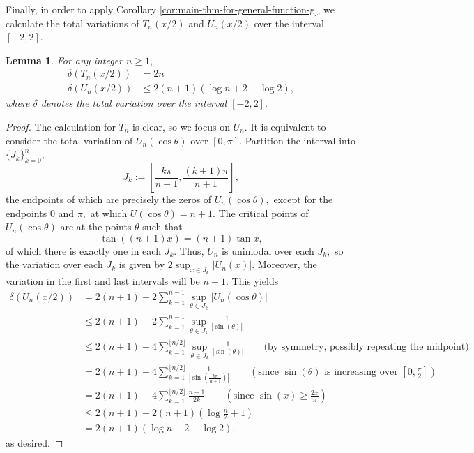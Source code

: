 \documentclass[11pt,letterpaper,reqno]{amsart}
\newtheorem{lemma}[theorem]{Lemma}
\theoremstyle{definition}
\numberwithin{equation}{section}
\numberwithin{figure}{section}
\numberwithin{table}{section}
\newcommand{\lrp}[1]{\left(#1\right)}
\begin{document}
Finally, in order to apply Corollary \ref{cor:main-thm-for-general-function-g}, we calculate the total variations of $T_n(x/2)$ and $U_n(x/2)$ over the interval $[-2, 2].$

\begin{lemma}\label{lem:variation-of-U}
    For any integer $n \geq 1,$
    \begin{align}
        \delta(T_n(x/2)) &= 2n
        \\
        \delta(U_n(x/2)) &\leq 2(n + 1) \left( \log n + 2 - \log 2 \right),
    \end{align}
    where $\delta$ denotes the total variation over the interval $[-2, 2].$
\end{lemma}
\begin{proof}
    The calculation for $T_n$ is clear, so we focus on $U_n.$ It is equivalent to consider the total variation of $U_n(\cos \theta)$ over $[0, \pi].$ Partition the interval into $\{J_k\}_{k = 0}^n,$
    $$J_k := \left[ \frac{k \pi}{n + 1}, \frac{(k + 1)\pi}{n + 1}  \right],$$
    the endpoints of which are precisely the zeros of $U_n(\cos \theta),$ except for the endpoints $0$ and $\pi,$ at which $U(\cos \theta) = n + 1.$ The critical points of $U_n(\cos \theta)$ are at the points $\theta$ such that
    $$\tan((n + 1) x) = (n + 1) \tan x,$$
    of which there is exactly one in each $J_k.$ Thus, $U_n$ is unimodal over each $J_k,$ so the variation over each $J_k$ is given by $2\sup_{x \in J_k} \left| U_n(x) \right|.$ Moreover, the variation in the first and last intervals will be $n + 1.$ This yields
    \begin{align}
        \delta(U_n(x/2)) &= 2(n + 1) + 2\sum_{k = 1}^{n - 1} \sup_{\theta \in J_k} \left| U_n(\cos \theta) \right|\\
        &\leq 2(n + 1) + 2\sum_{k = 1}^{n - 1} \sup_{\theta \in J_k} \frac{1}{\left| \sin(\theta) \right|}\\
        &\leq 2(n + 1) + 4\sum_{k = 1}^{\lfloor n/2 \rfloor} \sup_{\theta \in J_k} \frac{1}{\left| \sin(\theta) \right|} \qquad \text{(by symmetry, possibly repeating the midpoint)}\\
        &= 2(n + 1) + 4 \sum_{k = 1}^{\lfloor n/2 \rfloor}  \frac{1}{\left| \sin\left( \frac{k \pi}{n + 1}  \right) \right|}  \qquad \left( \text{since $\sin(\theta)$ is increasing over $\left[ 0, \frac{\pi}{2} \right]$}  \right)\\
        &= 2(n + 1) + 4 \sum_{k = 1}^{\lfloor n/2 \rfloor}   \frac{n + 1}{2k}  \qquad \left( \text{since $\sin(x) \geq \frac{2x}{\pi}$} \right)\\
        &\leq 2(n + 1) + 2(n + 1) \left( \log \frac{n}{2} + 1 \right) \\
        &= 2(n+1) \lrp{\log n + 2 - \log 2},
    \end{align}
    as desired.
\end{proof}
\end{document}
